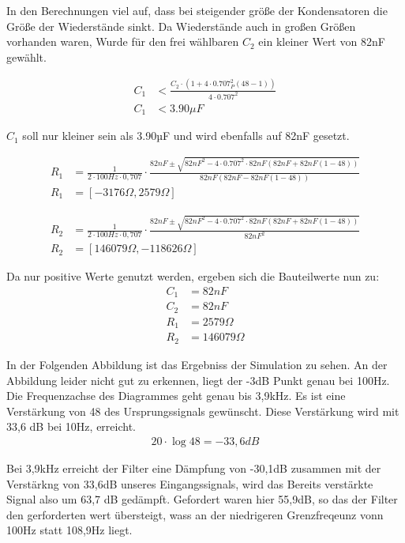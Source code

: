 In den Berechnungen viel auf, dass bei steigender größe der Kondensatoren die Größe der Wiederstände sinkt. Da Wiederstände auch in großen Größen vorhanden waren,
Wurde für den frei wählbaren $C_2$ ein kleiner Wert von 82nF gewählt.

\begin{align*}
C_1&<\frac{C_2\cdot(1+4\cdot0.707^2_P(48-1))}{4\cdot0.707^2}\\
C_1&<3.90\mu F
\end{align*}

$C_1$ soll nur kleiner sein als 3.90µF und wird ebenfalls auf 82nF gesetzt.

\begin{align*}
R_1&=\frac{1}{2\cdot100Hz\cdot0,707} \cdot \frac{82nF\pm\sqrt{82nF^2-4\cdot0.707^2\cdot82nF(82nF+82nF(1-48))}}{82nF(82nF-82nF(1-48))}\\
R_1&=[-3176\Omega,2579\Omega]
\end{align*}


\begin{align*}
R_2&=\frac{1}{2\cdot100Hz\cdot0,707} \cdot \frac{82nF\pm\sqrt{82nF^2-4\cdot0.707^2\cdot82nF(82nF+82nF(1-48))}}{82nF^2}\\
R_2&=[146079\Omega,-118626\Omega]
\end{align*}

Da nur positive Werte genutzt werden, ergeben sich die Bauteilwerte nun zu:
\begin{align*}
C_1&=82nF\\
C_2&=82nF\\
R_1&=2579\Omega\\
R_2&=146079\Omega
\end{align*}

In der Folgenden Abbildung ist das Ergebniss der Simulation zu sehen. An der Abbildung leider nicht gut zu erkennen,
liegt der -3dB Punkt genau bei 100Hz. Die Frequenzachse des Diagrammes geht genau bis 3,9kHz. 
Es ist eine Verstärkung von 48 des Ursprungssignals gewünscht. Diese Verstärkung wird mit 33,6 dB bei 10Hz, erreicht.
\begin{align*}
20\cdot\log{48}=-33,6dB
\end{align*}

Bei 3,9kHz erreicht der Filter eine Dämpfung von -30,1dB zusammen mit der Verstärkng von 33,6dB unseres Eingangssignals,
wird das Bereits verstärkte Signal also um 63,7 dB gedämpft. Gefordert waren hier 55,9dB, so das der Filter den gerforderten wert übersteigt, wass an der niedrigeren Grenzfreqeunz vonn 100Hz statt 108,9Hz liegt.

